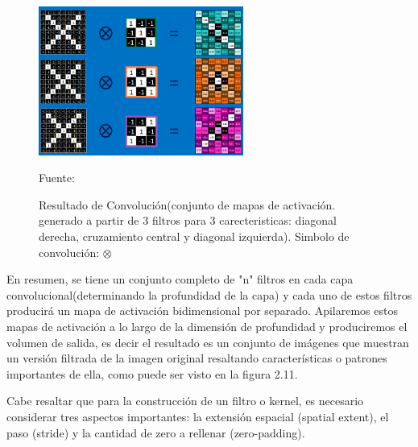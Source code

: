 		\begin{figure}[H]
		\begin{center}
		\includegraphics[width=0.6\textwidth]{images/marcoteorico/result_conv}
		\end{center}
		\begin{center}
		\vskip 0.1cm  
		\caption{\small{Resultado de Convolución(conjunto de mapas de activación. generado a partir de 3 filtros para 3 carecteristicas: diagonal derecha, cruzamiento central y diagonal izquierda). Simbolo de convolución: $\otimes$}}
		\vskip -0.1cm  
		{\small{Fuente: \citep{Rohrer}}}
		\end{center}
		\vspace{-1.9em}
		\end{figure}

		En resumen, se tiene un conjunto completo de "n"  filtros en cada capa convolucional(determinando la profundidad de la capa) y cada uno de estos filtros producirá un mapa de activación bidimensional por separado. Apilaremos estos mapas de activación a lo largo de la dimensión de profundidad y produciremos el volumen de salida, es decir el resultado es un conjunto de imágenes que muestran un versión filtrada de la imagen original resaltando características o patrones importantes de ella, como puede ser visto en la figura 2.11.

		\vskip 0.4cm  
		Cabe resaltar que para la construcción de un filtro o kernel, es necesario considerar tres aspectos importantes: la extensión espacial (spatial extent), el paso (stride) y la cantidad de zero a rellenar (zero-padding).
		\newpage
		
